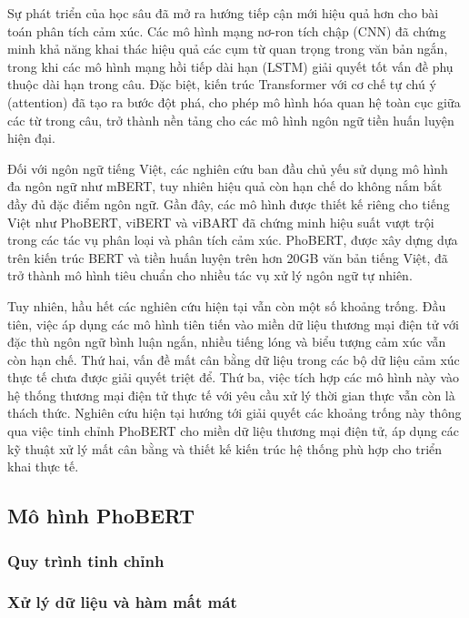 Sự phát triển của học sâu đã mở ra hướng tiếp cận mới hiệu quả hơn cho bài toán phân tích cảm xúc. Các mô hình mạng nơ-ron tích chập (CNN) đã chứng minh khả năng khai thác hiệu quả các cụm từ quan trọng trong văn bản ngắn, trong khi các mô hình mạng hồi tiếp dài hạn (LSTM) giải quyết tốt vấn đề phụ thuộc dài hạn trong câu. Đặc biệt, kiến trúc Transformer với cơ chế tự chú ý (attention) đã tạo ra bước đột phá, cho phép mô hình hóa quan hệ toàn cục giữa các từ trong câu, trở thành nền tảng cho các mô hình ngôn ngữ tiền huấn luyện hiện đại.

Đối với ngôn ngữ tiếng Việt, các nghiên cứu ban đầu chủ yếu sử dụng mô hình đa ngôn ngữ như mBERT, tuy nhiên hiệu quả còn hạn chế do không nắm bắt đầy đủ đặc điểm ngôn ngữ. Gần đây, các mô hình được thiết kế riêng cho tiếng Việt như PhoBERT, viBERT và viBART đã chứng minh hiệu suất vượt trội trong các tác vụ phân loại và phân tích cảm xúc. PhoBERT, được xây dựng dựa trên kiến trúc BERT và tiền huấn luyện trên hơn 20GB văn bản tiếng Việt, đã trở thành mô hình tiêu chuẩn cho nhiều tác vụ xử lý ngôn ngữ tự nhiên.

Tuy nhiên, hầu hết các nghiên cứu hiện tại vẫn còn một số khoảng trống. Đầu tiên, việc áp dụng các mô hình tiên tiến vào miền dữ liệu thương mại điện tử với đặc thù ngôn ngữ bình luận ngắn, nhiều tiếng lóng và biểu tượng cảm xúc vẫn còn hạn chế. Thứ hai, vấn đề mất cân bằng dữ liệu trong các bộ dữ liệu cảm xúc thực tế chưa được giải quyết triệt để. Thứ ba, việc tích hợp các mô hình này vào hệ thống thương mại điện tử thực tế với yêu cầu xử lý thời gian thực vẫn còn là thách thức. Nghiên cứu hiện tại hướng tới giải quyết các khoảng trống này thông qua việc tinh chỉnh PhoBERT cho miền dữ liệu thương mại điện tử, áp dụng các kỹ thuật xử lý mất cân bằng và thiết kế kiến trúc hệ thống phù hợp cho triển khai thực tế.

\subsection{Mô hình PhoBERT}
\subsubsection{Quy trình tinh chỉnh}
\subsubsection{Xử lý dữ liệu và hàm mất mát}
